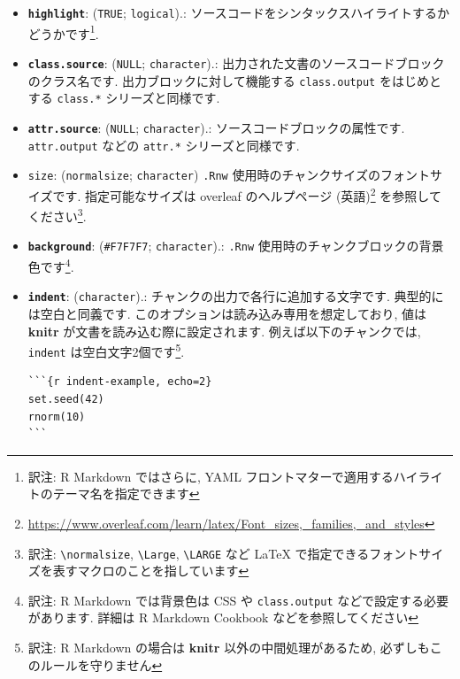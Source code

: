 \documentclass[
  11pt,
  lualatex,ja=standard,jafont=noto]{bxjsreport}
\renewcommand{\href}[2]{#2\footnote{\url{#1}}}
\begin{document}
\begin{itemize}
\item
  \textbf{\texttt{highlight}}: (\texttt{TRUE}; \texttt{logical}).: ソースコードをシンタックスハイライトするかどうかです\footnote{訳注: R Markdown ではさらに, YAML フロントマターで適用するハイライトのテーマ名を指定できます}.
\item
  \textbf{\texttt{class.source}}: (\texttt{NULL}; \texttt{character}).: 出力された文書のソースコードブロックのクラス名です. 出力ブロックに対して機能する \texttt{class.output} をはじめとする \texttt{class.*} シリーズと同様です.
\item
  \textbf{\texttt{attr.source}}: (\texttt{NULL}; \texttt{character}).: ソースコードブロックの属性です. \texttt{attr.output} などの \texttt{attr.*} シリーズと同様です.
\item
  \texttt{size}: (\texttt{\textquotesingle{}normalsize\textquotesingle{}}; \texttt{character}) \texttt{.Rnw} 使用時のチャンクサイズのフォントサイズです. 指定可能なサイズは \href{https://www.overleaf.com/learn/latex/Font_sizes,_families,_and_styles}{overleaf のヘルプページ (英語)} を参照してください\footnote{訳注: \texttt{\textbackslash{}normalsize}, \texttt{\textbackslash{}Large}, \texttt{\textbackslash{}LARGE} など LaTeX で指定できるフォントサイズを表すマクロのことを指しています}.
\item
  \textbf{\texttt{background}}: (\texttt{\textquotesingle{}\#F7F7F7\textquotesingle{}}; \texttt{character}).: \texttt{.Rnw} 使用時のチャンクブロックの背景色です\footnote{訳注: R Markdown では背景色は CSS や \texttt{class.output} などで設定する必要があります. 詳細は R Markdown Cookbook などを参照してください}.
\item
  \textbf{\texttt{indent}}: (\texttt{character}).: チャンクの出力で各行に追加する文字です. 典型的には空白と同義です. このオプションは読み込み専用を想定しており, 値は \textbf{knitr} が文書を読み込む際に設定されます. 例えば以下のチャンクでは, \texttt{indent} は空白文字2個です\footnote{訳注: R Markdown の場合は \textbf{knitr} 以外の中間処理があるため, 必ずしもこのルールを守りません}.

\begin{verbatim}
```{r indent-example, echo=2}
set.seed(42)
rnorm(10)
```
\end{verbatim}

  \hypertarget{cache-options}{%
}
\end{itemize}
\end{document}
